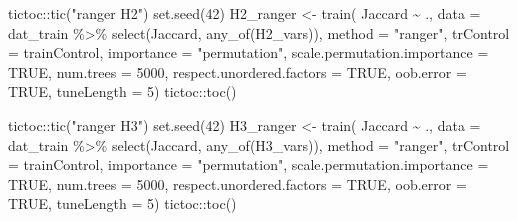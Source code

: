 \documentclass[
  letterpaper,
  DIV=11,
  numbers=noendperiod]{scrartcl}
\newenvironment{Shaded}{\begin{snugshade}}{\end{snugshade}}
\newcommand{\AttributeTok}[1]{\textcolor[rgb]{0.40,0.45,0.13}{#1}}
\newcommand{\ConstantTok}[1]{\textcolor[rgb]{0.56,0.35,0.01}{#1}}
\newcommand{\DecValTok}[1]{\textcolor[rgb]{0.68,0.00,0.00}{#1}}
\newcommand{\FunctionTok}[1]{\textcolor[rgb]{0.28,0.35,0.67}{#1}}
\newcommand{\NormalTok}[1]{\textcolor[rgb]{0.00,0.23,0.31}{#1}}
\newcommand{\OtherTok}[1]{\textcolor[rgb]{0.00,0.23,0.31}{#1}}
\newcommand{\SpecialCharTok}[1]{\textcolor[rgb]{0.37,0.37,0.37}{#1}}
\newcommand{\StringTok}[1]{\textcolor[rgb]{0.13,0.47,0.30}{#1}}
\begin{document}
\begin{Shaded}
\begin{Highlighting}[]
\NormalTok{tictoc}\SpecialCharTok{::}\FunctionTok{tic}\NormalTok{(}\StringTok{"ranger H2"}\NormalTok{)}
\FunctionTok{set.seed}\NormalTok{(}\DecValTok{42}\NormalTok{)}
\NormalTok{H2\_ranger }\OtherTok{\textless{}{-}} \FunctionTok{train}\NormalTok{(}
\NormalTok{    Jaccard }\SpecialCharTok{\textasciitilde{}}\NormalTok{ .,}
    \AttributeTok{data =}\NormalTok{ dat\_train }\SpecialCharTok{\%\textgreater{}\%} \FunctionTok{select}\NormalTok{(Jaccard, }\FunctionTok{any\_of}\NormalTok{(H2\_vars)),}
    \AttributeTok{method =} \StringTok{"ranger"}\NormalTok{,}
    \AttributeTok{trControl =}\NormalTok{ trainControl,}
    \AttributeTok{importance =} \StringTok{"permutation"}\NormalTok{,}
    \AttributeTok{scale.permutation.importance =} \ConstantTok{TRUE}\NormalTok{,}
    \AttributeTok{num.trees =} \DecValTok{5000}\NormalTok{,}
    \AttributeTok{respect.unordered.factors =} \ConstantTok{TRUE}\NormalTok{,}
    \AttributeTok{oob.error =} \ConstantTok{TRUE}\NormalTok{,}
    \AttributeTok{tuneLength =} \DecValTok{5}\NormalTok{)}
\NormalTok{tictoc}\SpecialCharTok{::}\FunctionTok{toc}\NormalTok{()}


\NormalTok{tictoc}\SpecialCharTok{::}\FunctionTok{tic}\NormalTok{(}\StringTok{"ranger H3"}\NormalTok{)}
\FunctionTok{set.seed}\NormalTok{(}\DecValTok{42}\NormalTok{)}
\NormalTok{H3\_ranger }\OtherTok{\textless{}{-}} \FunctionTok{train}\NormalTok{(}
\NormalTok{    Jaccard }\SpecialCharTok{\textasciitilde{}}\NormalTok{ .,}
    \AttributeTok{data =}\NormalTok{ dat\_train }\SpecialCharTok{\%\textgreater{}\%} \FunctionTok{select}\NormalTok{(Jaccard, }\FunctionTok{any\_of}\NormalTok{(H3\_vars)),}
    \AttributeTok{method =} \StringTok{"ranger"}\NormalTok{,}
    \AttributeTok{trControl =}\NormalTok{ trainControl,}
    \AttributeTok{importance =} \StringTok{"permutation"}\NormalTok{,}
    \AttributeTok{scale.permutation.importance =} \ConstantTok{TRUE}\NormalTok{,}
    \AttributeTok{num.trees =} \DecValTok{5000}\NormalTok{,}
    \AttributeTok{respect.unordered.factors =} \ConstantTok{TRUE}\NormalTok{,}
    \AttributeTok{oob.error =} \ConstantTok{TRUE}\NormalTok{,}
    \AttributeTok{tuneLength =} \DecValTok{5}\NormalTok{)}
\NormalTok{tictoc}\SpecialCharTok{::}\FunctionTok{toc}\NormalTok{()}


\end{Highlighting}
\end{Shaded}
\end{document}
